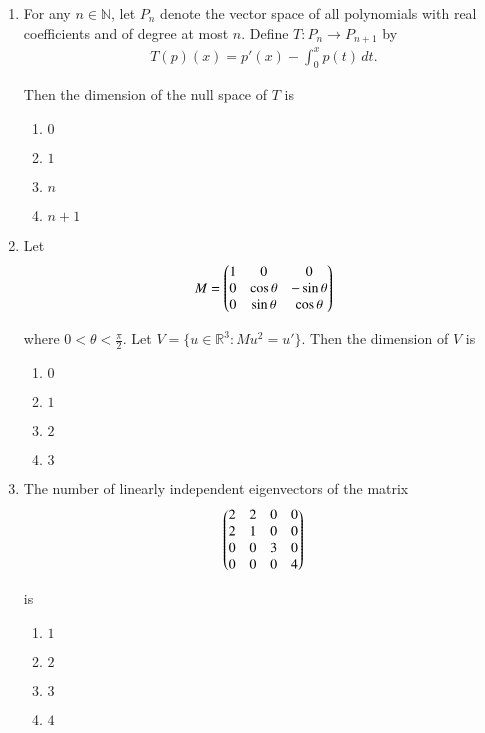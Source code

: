 \documentclass[journal]{IEEEtran}
\numberwithin{equation}{enumi}
\numberwithin{figure}{enumi}
\begin{document}
\begin{enumerate}
\item
For any $n \in \mathbb{N}$, let $P_n$ denote the vector space of all polynomials with real coefficients and of degree at most $n$. Define $T:P_n \to P_{n+1}$ by
\begin{align}
    T(p)(x) = p'(x) - \int_0^x p(t) \, dt.
\end{align}

Then the dimension of the null space of $T$ is
\hfill{}
\begin{multicols}{4}
\begin{enumerate}
    \item $0$
    \item $1$
    \item $n$
    \item $n+1$
\end{enumerate}
\end{multicols}


\item
Let
\begin{align}
    M = \begin{pmatrix}1 & 0 & 0 \\ 0 & \cos\theta & -\sin\theta \\ 0 & \sin\theta & \cos\theta\end{pmatrix}
\end{align}


where $0 < \theta < \frac{\pi}{2}$. Let $V = \{ u \in \mathbb{R}^3 : M u^2 = u' \}$. Then the dimension of $V$ is
\hfill{}
\begin{multicols}{4}
\begin{enumerate}
    \item $0$
    \item $1$
    \item $2$
    \item $3$
\end{enumerate}
\end{multicols}


\item
The number of linearly independent eigenvectors of the matrix
\begin{align}
   \begin{pmatrix}2 & 2 & 0 & 0 \\ 2 & 1 & 0 & 0 \\ 0 & 0 & 3 & 0 \\ 0 & 0 & 0 & 4\end{pmatrix} 
\end{align}

is
\hfill{}
\begin{multicols}{4}
\begin{enumerate}
    \item $1$
    \item $2$
    \item $3$
    \item $4$
\end{enumerate}
\end{multicols}


\end{enumerate}
\end{document}
